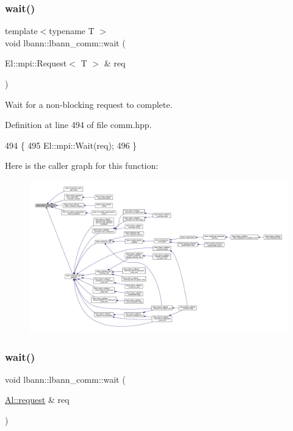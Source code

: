 \subsubsection{\texorpdfstring{wait()}{wait()}\hspace{0.1cm}{\footnotesize\ttfamily [1/2]}}
{\footnotesize\ttfamily template$<$typename T $>$ \\
void lbann\+::lbann\+\_\+comm\+::wait (\begin{DoxyParamCaption}\item[{El\+::mpi\+::\+Request$<$ T $>$ \&}]{req }\end{DoxyParamCaption})\hspace{0.3cm}{\ttfamily [inline]}}

Wait for a non-\/blocking request to complete. 

Definition at line 494 of file comm.\+hpp.


\begin{DoxyCode}
494                                   \{
495     El::mpi::Wait(req);
496   \}
\end{DoxyCode}
Here is the caller graph for this function\+:\nopagebreak
\begin{figure}[H]
\begin{center}
\leavevmode
\includegraphics[width=350pt]{classlbann_1_1lbann__comm_a30439f28cf615e1406090799c5499321_icgraph}
\end{center}
\end{figure}
\mbox{\label{classlbann_1_1lbann__comm_a91d09d595801f6228ee0aecf6dea25c7}} 
\subsubsection{\texorpdfstring{wait()}{wait()}\hspace{0.1cm}{\footnotesize\ttfamily [2/2]}}
{\footnotesize\ttfamily void lbann\+::lbann\+\_\+comm\+::wait (\begin{DoxyParamCaption}\item[{\hyperlink{structlbann_1_1Al_1_1request}{Al\+::request} \&}]{req }\end{DoxyParamCaption})}

